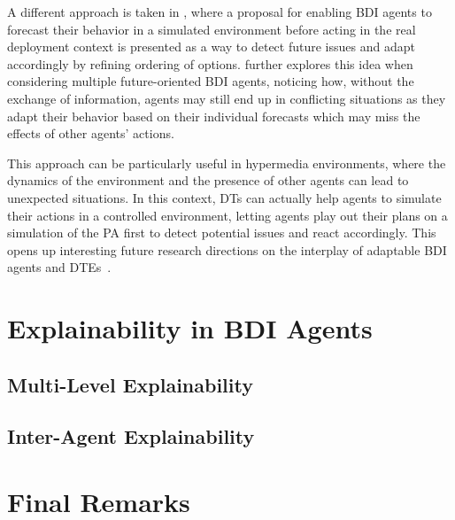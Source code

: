 A different approach is taken in \cite{DBLP:journals/aamas/HubnerBRM25}, 
where a proposal for enabling \ac{BDI} agents to forecast their behavior in a simulated environment before acting in the real deployment context is presented as a way to detect future issues and adapt accordingly by refining ordering of options.
%
\cite{wesaac} further explores this idea when considering multiple future-oriented \ac{BDI} agents, noticing how, without the exchange of information, agents may still end up in conflicting situations as they adapt their behavior based on their individual forecasts which may miss the effects of other agents' actions.

This approach can be particularly useful in hypermedia environments,
where the dynamics of the environment and the presence of other agents can lead to unexpected situations.
%
In this context, \acp{DT} can actually help agents to simulate their actions in a controlled environment, letting agents play out their plans on a simulation of the \ac{PA} first to detect potential issues and react accordingly.
%
This opens up interesting future research directions on the interplay of adaptable \ac{BDI} agents and \acp{DTE}~\cite{DBLP:conf/eumas/Burattini23}.


\section{Explainability in \acs{BDI} Agents}

\subsection{Multi-Level Explainability}


\subsection{Inter-Agent Explainability}


\section{Final Remarks}

